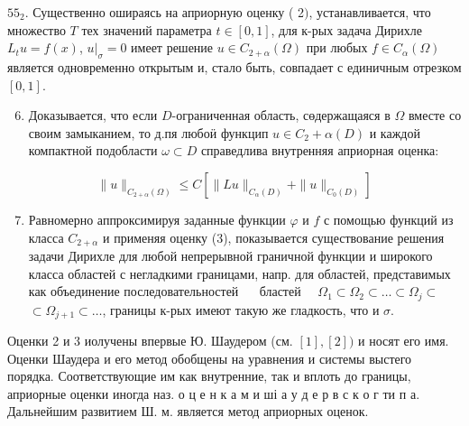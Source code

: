 \documentclass[10pt]{article}
\begin{document}
$55_{2}$. Существенно ошираясь на априорную оценку ( 2$)$, устанавливается, что множество $T$ тех значений параметра $t \in[0,1]$, для к-рых задача Дирихле $L_{t} u=f(x)$, $\left.u\right|_{\sigma}=0$ имеет решение $u \in C_{2+\alpha}(\Omega)$ при любых $f \in C_{\alpha}(\Omega)$ является одновременно открытым и, стало быть, совпадает с единичным отрезком $[0,1]$.



\begin{enumerate}

  \setcounter{enumi}{5}

  \item Доказывается, что если $D$-ограниченная область, сөдержащаяся в $\Omega$ вместе со своим замыканием, то д.пя любоӥ функцип $u \in C_{2}+\alpha(D)$ и каждой компактной подобласти $\omega \subset D$ справедлива внутренняя априорная оценка:

\end{enumerate}



\[

\|u\|_{C_{2+\alpha}(\Omega)} \leqslant C\left[\|L u\|_{C_{\alpha}(D)}+\|u\|_{C_{0}(D)}\right]

\]



\begin{enumerate}

  \setcounter{enumi}{6}

  \item Равномерно аппроксимируя заданные функции $\varphi$ и $f$ с помощью функций из класса $C_{2+\alpha}$ и применяя оценку (3), показывается существование решения задачи Дирихле для любой непрерывной граничной функции и широкого класса областей с негладкими границами, напр. для областей, представимых как объединение последовательностей $\quad$ бластей $\quad \Omega_{1} \subset \Omega_{2} \subset \ldots \subset \Omega_{j} \subset$ $\subset \Omega_{j+1} \subset \ldots$, границы к-рых имеют такую же гладкость, что и $\sigma$.

\end{enumerate}



Оценки 2 и 3 иолучены впервые Ю. Шаудером (см. $[1],[2])$ и носят его имя. Оценки Шаудера и его метод обобщены на уравнения и системы выстего порядка. Соответствующие им как внутренние, так и вплоть до границы, априорные оценки иногда наз. о ц е н к а м и ші а у д е р в с к о г ти п а. Дальнейшим развитием Ш. м. является метод априорных оценок.
\end{document}
